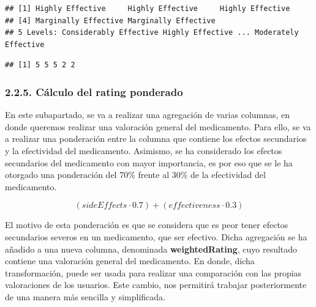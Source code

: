\documentclass[spanish,]{article}
\newenvironment{Shaded}{\begin{snugshade}}{\end{snugshade}}
\newcommand{\KeywordTok}[1]{\textcolor[rgb]{0.13,0.29,0.53}{\textbf{#1}}}
\newcommand{\DecValTok}[1]{\textcolor[rgb]{0.00,0.00,0.81}{#1}}
\newcommand{\OperatorTok}[1]{\textcolor[rgb]{0.81,0.36,0.00}{\textbf{#1}}}
\newcommand{\NormalTok}[1]{#1}
\begin{document}
\begin{verbatim}
## [1] Highly Effective     Highly Effective     Highly Effective    
## [4] Marginally Effective Marginally Effective
## 5 Levels: Considerably Effective Highly Effective ... Moderately Effective
\end{verbatim}

\begin{Shaded}
\end{Shaded}

\begin{verbatim}
## [1] 5 5 5 2 2
\end{verbatim}

\subsubsection{2.2.5. Cálculo del rating
ponderado}\label{calculo-del-rating-ponderado}

En este subapartado, se va a realizar una agregación de varias columnas,
en donde queremos realizar una valoración general del medicamento. Para
ello, se va a realizar una ponderación entre la columna que contiene los
efectos secundarios y la efectividad del medicamento. Asimismo, se ha
considerado los efectos secundarios del medicamento con mayor
importancia, es por eso que se le ha otorgado una ponderación del 70\%
frente al 30\% de la efectividad del medicamento.

\[( sideEffects \cdot 0.7 ) + ( effectiveness \cdot 0.3 )\]

El motivo de esta ponderación es que se considera que es peor tener
efectos secundarios severos en un medicamento, que ser efectivo. Dicha
agregación se ha añadido a una nueva columna, denominada
\textbf{weightedRating}, cuyo resultado contiene una valoración general
del medicamento. En donde, dicha transformación, puede ser usada para
realizar una comparación con las propias valoraciones de los usuarios.
Este cambio, nos permitirá trabajar posteriormente de una manera más
sencilla y simplificada.
\end{document}
